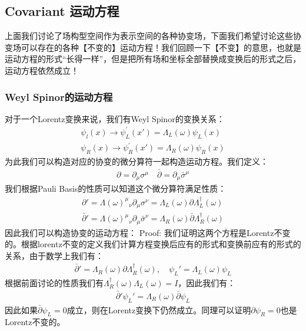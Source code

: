 \subsection{Covariant 运动方程}

上面我们讨论了场构型空间作为表示空间的各种协变场，下面我们希望讨论这些协变场可以存在的各种【不变的】运动方程！我们回顾一下【不变】的意思，也就是运动方程的形式“长得一样”，但是把所有场和坐标全部替换成变换后的形式之后，运动方程依然成立！

\subsubsection{Weyl Spinor的运动方程}


对于一个Lorentz变换来说，我们有Weyl Spinor的变换关系：
\begin{align}
  \psi_l(x) \to \psi_L^{\prime}(x')=\Lambda_L(\omega)\psi_L(x) \\
  \psi_R(x) \to \psi_R^{\prime}(x')=\Lambda_R(\omega)\psi_R(x)
\end{align}
为此我们可以构造对应的协变的微分算符一起构造运动方程。我们定义：
\begin{align}
  \partial = \partial_\mu \sigma^\mu \quad \bar{\partial} = \partial_\mu \bar{\sigma}^\mu
\end{align}
我们根据Pauli Basis的性质可以知道这个微分算符满足性质：
\begin{align}
   \partial'  = \Lambda(\omega)^\mu{}_\nu \partial_\mu \sigma^\nu= \Lambda_L(\omega) \partial \Lambda_L^\dagger(\omega) \\
   \bar{\partial}' = \Lambda(\omega)^\mu{}_\nu \partial_\mu \bar{\sigma}^\nu = \Lambda_R(\omega) \bar{\partial} \Lambda_R^\dagger(\omega)
\end{align}
因此我们可以构造协变的运动方程：
Proof: 我们证明这两个方程是Lorentz不变的。根据lorentz不变的定义我们计算方程变换后应有的形式和变换前应有的形式的关系，由于数学上我们有：
\begin{align}
   \bar{\partial}' = \Lambda_R(\omega) \partial \Lambda_R^\dagger(\omega), \quad \psi_L' = \Lambda_L(\omega) \psi_L
\end{align}
根据前面讨论的性质我们有$ \Lambda_R^\dagger(\omega)\Lambda_L(\omega) = I $，因此我们有：
\begin{align}
  \bar{\partial}'\psi_L'  = \Lambda_R(\omega) \bar{\partial} \psi_L
\end{align}
因此如果$ \bar{\partial}\psi_L = 0 $成立，则在Lorentz变换下仍然成立。同理可以证明$ \partial \psi_R = 0 $也是Lorentz不变的。

